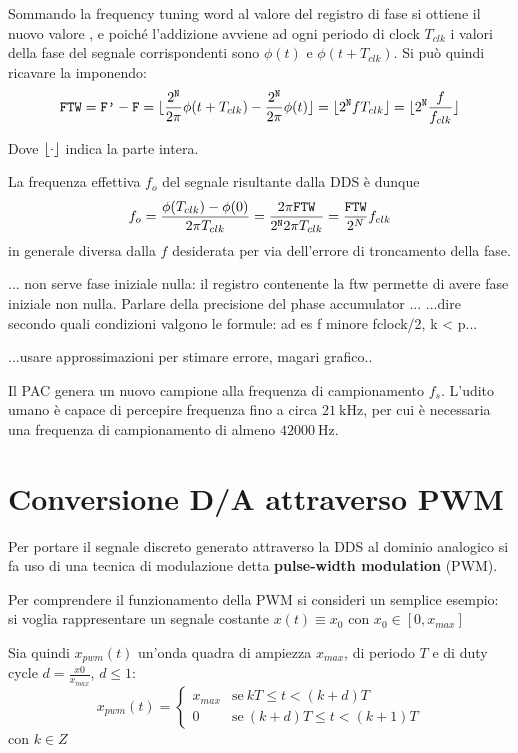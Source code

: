 Sommando la frequency tuning word al valore del registro di fase  si ottiene il nuovo valore ,
e poiché l'addizione avviene ad ogni periodo di clock $T_{clk}$ i valori della fase del segnale corrispondenti sono
$\phi(t)$ e $\phi(t + T_{clk})$.
Si può quindi ricavare la  imponendo:
\[
\texttt{FTW} = \texttt{F'} - \texttt{F} = 
\lfloor\frac{2^{\texttt{N}}}{2\pi}\phi(t+T_{clk}) - \frac{2^{\texttt{N}}}{2\pi}\phi(t)\rfloor
= \lfloor2^{\texttt{N}} f T_{clk}\rfloor = \lfloor2^{\texttt{N}} \frac{f}{f_{clk}}\rfloor
\]

Dove $\lfloor\cdot\rfloor$ indica la parte intera.

La frequenza effettiva $f_{o}$ del segnale risultante dalla DDS è dunque
\[
f_{o} = \frac{\phi(T_{clk}) - \phi(0)}{2\pi T_{clk}} = \frac{2\pi \texttt{FTW}}{2^{\texttt{N}} 2 \pi T_{clk}} = \frac{\texttt{FTW}}{2^N} f_{clk}
\]
in generale diversa dalla $f$ desiderata per via dell'errore di troncamento della fase.

... non serve fase iniziale nulla: il registro contenente la ftw permette
di avere fase iniziale non nulla. Parlare della precisione del 
phase accumulator ...
...dire secondo quali condizioni valgono le formule: ad es f minore fclock/2, k < p...

...usare approssimazioni per stimare errore, magari grafico..

Il PAC genera un nuovo campione alla frequenza di campionamento $f_s$.
L'udito umano è capace di percepire frequenza fino a circa $\SI{21}{\kilo\hertz}$, per cui è necessaria una frequenza di campionamento di almeno $\SI{42000}{\hertz}$.

\section{Conversione D/A attraverso PWM}
Per portare il segnale discreto generato attraverso la DDS al dominio analogico si fa uso di una tecnica di modulazione detta \textbf{pulse-width modulation} (PWM).

Per comprendere il funzionamento della PWM si consideri un semplice esempio: si voglia rappresentare un segnale costante $x(t) \equiv x_0$ con $x_0 \in [0, x_{max}]$

Sia quindi $x_{pwm}(t)$ un'onda quadra di ampiezza $x_{max}$, di periodo $T$ e di duty cycle $d=\frac{x0}{x_{max}}$, $d \le 1$:
\[
x_{pwm}(t) = \begin{cases}
	x_{max} & \text{se}\ kT \le t < (k+d)T \\
	0 & \text{se}\ (k+d)T \le t < (k+1)T
\end{cases}
\] 
con $k \in Z$


